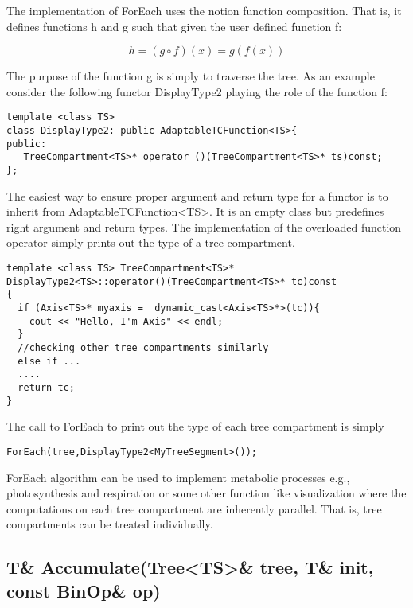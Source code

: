 The implementation of ForEach uses   the notion function  composition.
That is, it defines functions h and g such that given the user defined
function f:

\begin{displaymath}
h = (g \circ f)(x) = g(f(x))
\end{displaymath}

The purpose of the function g is  simply to traverse  the tree.  As an
example consider the  following functor DisplayType2 playing  the role
of the function f:

\begin{verbatim}
template <class TS>
class DisplayType2: public AdaptableTCFunction<TS>{
public:
   TreeCompartment<TS>* operator ()(TreeCompartment<TS>* ts)const;
};
\end{verbatim}

The easiest  way  to ensure proper   argument  and return  type  for a
functor  is to inherit from  AdaptableTCFunction<TS>.   It is an empty
class   but predefines   right    argument  and return   types.    The
implementation of  the overloaded function  operator simply prints out
the type of a tree compartment.

\begin{verbatim}
template <class TS> TreeCompartment<TS>* 
DisplayType2<TS>::operator()(TreeCompartment<TS>* tc)const
{
  if (Axis<TS>* myaxis =  dynamic_cast<Axis<TS>*>(tc)){
    cout << "Hello, I'm Axis" << endl;
  }
  //checking other tree compartments similarly
  else if ...  
  ....
  return tc;
}
\end{verbatim}

The call to ForEach to print out the type of each tree compartment is
simply 

\begin{verbatim}
ForEach(tree,DisplayType2<MyTreeSegment>());
\end{verbatim}

ForEach  algorithm can be used to  implement metabolic processes e.g.,
photosynthesis   and respiration     or some  other   function    like
visualization where the computations  on   each tree compartment   are
inherently parallel.  That   is,  tree  compartments can  be   treated
individually.

\subsection{T\& Accumulate(Tree<TS>\& tree, T\& init, const BinOp\& op)}

